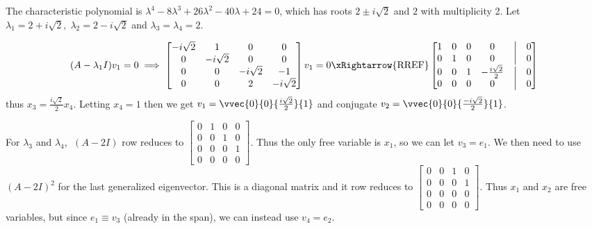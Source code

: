 The characteristic polynomial is $\lambda^4 -8\lambda^3 + 26 \lambda^2 - 40\lambda + 24 = 0$, which has roots $2 \pm i \sqrt{2}$ and $2$ with multiplicity 2. Let $\lambda_1 = 2 + i\sqrt{2}, \; \lambda_2 = 2 - i\sqrt{2}$ and $\lambda_3 = \lambda_4 = 2$. 

$$(A-\lambda_1I)v_1 = 0 \implies \begin{bmatrix}
    -i\sqrt{2}&1&0&0 \\
    0&-i\sqrt{2}&0&0 \\
    0&0&-i\sqrt{2}&-1 \\
    0&0&2&-i\sqrt{2}
\end{bmatrix}v_1 = 0 \xRightarrow{\text{RREF}} \begin{bmatrix}
    1&0&0&0 & \bigm| & 0 \\
    0&1&0&0 & \bigm| & 0 \\
    0&0&1&-\frac{i\sqrt{2}}{2} & \bigm| & 0 \\
    0&0&0&0 & \bigm| & 0 
\end{bmatrix} $$
thus $x_3 = \frac{i\sqrt{2}}{2}x_4$. Letting $x_4 = 1$ then we get $v_1 = \vvec{0}{0}{\frac{i\sqrt{2}}{2}}{1}$ and conjugate $v_2 = \vvec{0}{0}{\frac{-i\sqrt{2}}{2}}{1}$.

For $\lambda_3$ and $\lambda_4$, $\;(A-2I)$ row reduces to $\begin{bmatrix}
    0 & 1 & 0 & 0 \\ 0&0&1&0 \\ 0&0&0&1 \\ 0&0&0&0
\end{bmatrix}$. Thus the only free variable is $x_1$, so we can let $v_3 = e_1$. We then need to use $(A-2I)^2$ for the last generalized eigenvector. This is a diagonal matrix and it row reduces to $\begin{bmatrix}
    0 & 0 & 1 & 0 \\ 0&0&0&1 \\ 0&0&0&0 \\ 0&0&0&0
\end{bmatrix}$. Thus $x_1$ and $x_2$ are free variables, but since $e_1 \equiv v_3$ (already in the span), we can instead use $v_4 = e_2$.